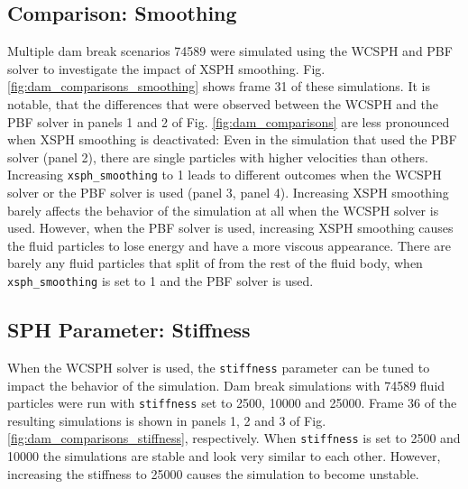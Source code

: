 \documentclass[11pt, letterpaper, twocolumn]{article}
\begin{document}
\subsection{Comparison: Smoothing}
\label{subsec:comparison_smoothing}
Multiple dam break scenarios 74589 were simulated using the WCSPH and PBF solver to investigate the impact of XSPH smoothing. Fig. \ref{fig:dam_comparisons_smoothing} shows frame 31 of these simulations. It is notable, that the differences that were observed between the WCSPH and the PBF solver in panels 1 and 2 of Fig. \ref{fig:dam_comparisons} are less pronounced when XSPH smoothing
is deactivated: Even in the simulation that used the PBF solver (panel 2), there are single particles with higher velocities than others. Increasing \texttt{xsph\_smoothing} to 1 leads to different outcomes when the WCSPH solver or the PBF solver is used (panel 3, panel 4). Increasing XSPH smoothing barely affects the behavior of the simulation at all when the WCSPH solver is used. However, when the
PBF solver is used, increasing XSPH smoothing causes the fluid particles to lose energy and have a more viscous appearance. There are barely any fluid particles that split of from the rest of the fluid body, when \texttt{xsph\_smoothing} is set to 1 and the PBF solver is used.   

\subsection{SPH Parameter: Stiffness}
\label{subsec:sph_param_stiffness}
When the WCSPH solver is used, the \texttt{stiffness} parameter can be tuned to impact the behavior of the simulation. Dam break simulations with 74589 fluid particles were run with \texttt{stiffness} set to 2500, 10000 and 25000. Frame 36 of the resulting simulations is shown in panels 1, 2 and 3 of Fig. \ref{fig:dam_comparisons_stiffness}, respectively. When \texttt{stiffness} is set to 2500 and 10000
the simulations are stable and look very similar to each other. However, increasing the stiffness to 25000 causes the simulation to become unstable.

\end{document}
